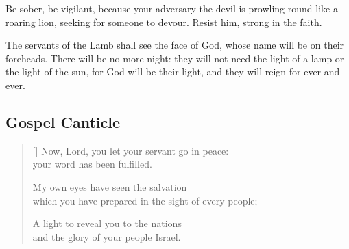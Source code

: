 \documentclass[12pt]{extreport}
\begin{document}
	\alternative

	\begin{scripture}[1 Peter 5.8, 9]
		Be sober, be vigilant, because your adversary the devil is prowling round like a roaring lion, seeking for someone to devour. Resist him, strong in the faith.
	\end{scripture}

	\newpage

	\alternative

	\begin{scripture}[Revelation 22.4, 5]
		The servants of the Lamb shall see the face of God, whose name will be on their foreheads. There will be no more night: they will not need the light of a lamp or the light of the sun, for God will be their light, and they will reign for ever and ever.
	\end{scripture}

	\vspace*{2ex}





	\subsection*{Gospel Canticle}



	\begin{verse}[\versewidth]
		Now, Lord, you let your servant go in peace: \Pause\\
		your word has been fulfilled.

		My own eyes have seen the salvation \Pause\\
		which you have prepared in the sight of every people;

		A light to reveal you to the nations \Pause\\
		and the glory of your people Israel.\\
	\end{verse}
\end{document}
